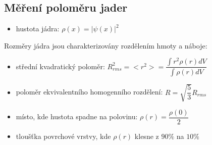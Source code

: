 \documentclass[../../main.tex]{subfiles}
\begin{document}
\subsection{Měření poloměru jader}

\begin{itemize}
	\item hustota jádra: $\rho (x) = | \psi (x) |^2$
\end{itemize}
Rozměry jádra jsou charakterizovány rozdělením hmoty a náboje:
\begin{itemize}
	\item střední kvadratický poloměr: $R^{2}_{rms} = <r^2> = \dfrac{\int r^2 \rho (r) dV}{\int \rho (r) dV}$
	\item poloměr ekvivalentního homogenního rozdělení: $R = \sqrt{\dfrac{5}{3}} R_{rms}$
	\item místo, kde hustota spadne na polovinu: $\rho (r) = \dfrac{\rho (0)}{2}$
	\item tloušťka povrchové vrstvy, kde $\rho (r)$ klesne z $90 \%$ na $10 \%$
\end{itemize}
\end{document}

